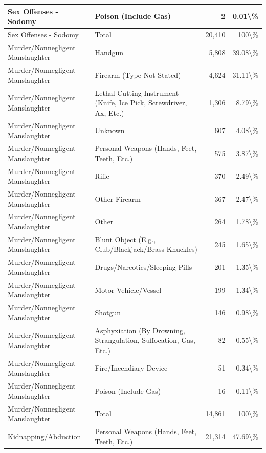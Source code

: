 \documentclass[
]{krantz}
\begin{document}
\begin{longtable}[t]{l|l|r|r}
\hline
Sex Offenses - Sodomy & Poison (Include Gas) & 2 & 0.01\textbackslash{}\%\\
\hline
Sex Offenses - Sodomy & Total & 20,410 & 100\textbackslash{}\%\\
\hline
Murder/Nonnegligent Manslaughter & Handgun & 5,808 & 39.08\textbackslash{}\%\\
\hline
Murder/Nonnegligent Manslaughter & Firearm (Type Not Stated) & 4,624 & 31.11\textbackslash{}\%\\
\hline
Murder/Nonnegligent Manslaughter & Lethal Cutting Instrument (Knife, Ice Pick, Screwdriver, Ax, Etc.) & 1,306 & 8.79\textbackslash{}\%\\
\hline
Murder/Nonnegligent Manslaughter & Unknown & 607 & 4.08\textbackslash{}\%\\
\hline
Murder/Nonnegligent Manslaughter & Personal Weapons (Hands, Feet, Teeth, Etc.) & 575 & 3.87\textbackslash{}\%\\
\hline
Murder/Nonnegligent Manslaughter & Rifle & 370 & 2.49\textbackslash{}\%\\
\hline
Murder/Nonnegligent Manslaughter & Other Firearm & 367 & 2.47\textbackslash{}\%\\
\hline
Murder/Nonnegligent Manslaughter & Other & 264 & 1.78\textbackslash{}\%\\
\hline
Murder/Nonnegligent Manslaughter & Blunt Object (E.g., Club/Blackjack/Brass Knuckles) & 245 & 1.65\textbackslash{}\%\\
\hline
Murder/Nonnegligent Manslaughter & Drugs/Narcotics/Sleeping Pills & 201 & 1.35\textbackslash{}\%\\
\hline
Murder/Nonnegligent Manslaughter & Motor Vehicle/Vessel & 199 & 1.34\textbackslash{}\%\\
\hline
Murder/Nonnegligent Manslaughter & Shotgun & 146 & 0.98\textbackslash{}\%\\
\hline
Murder/Nonnegligent Manslaughter & Asphyxiation (By Drowning, Strangulation, Suffocation, Gas, Etc.) & 82 & 0.55\textbackslash{}\%\\
\hline
Murder/Nonnegligent Manslaughter & Fire/Incendiary Device & 51 & 0.34\textbackslash{}\%\\
\hline
Murder/Nonnegligent Manslaughter & Poison (Include Gas) & 16 & 0.11\textbackslash{}\%\\
\hline
Murder/Nonnegligent Manslaughter & Total & 14,861 & 100\textbackslash{}\%\\
\hline
Kidnapping/Abduction & Personal Weapons (Hands, Feet, Teeth, Etc.) & 21,314 & 47.69\textbackslash{}\%\\

\end{longtable}
\end{document}
